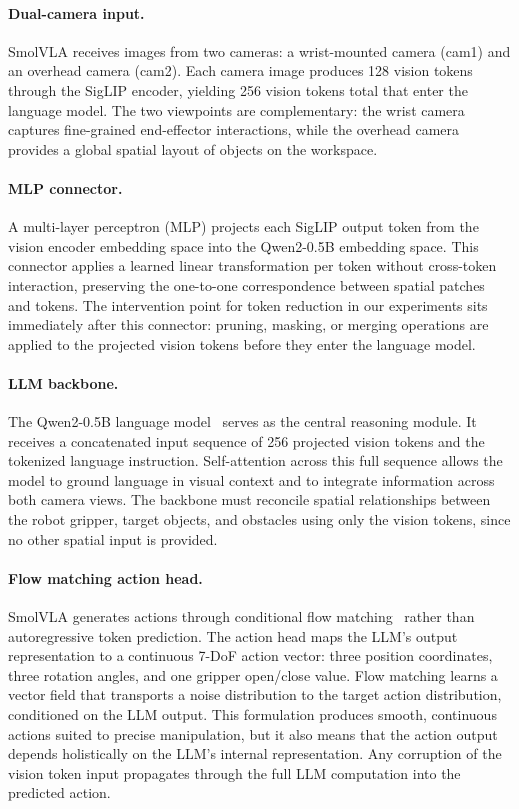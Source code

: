 \paragraph{Dual-camera input.}
SmolVLA receives images from two cameras: a wrist-mounted camera (cam1) and an overhead camera (cam2).
Each camera image produces 128 vision tokens through the SigLIP encoder, yielding 256 vision tokens total that enter the language model.
The two viewpoints are complementary: the wrist camera captures fine-grained end-effector interactions, while the overhead camera provides a global spatial layout of objects on the workspace.

\paragraph{MLP connector.}
A multi-layer perceptron (MLP) projects each SigLIP output token from the vision encoder embedding space into the Qwen2-0.5B embedding space.
This connector applies a learned linear transformation per token without cross-token interaction, preserving the one-to-one correspondence between spatial patches and tokens.
The intervention point for token reduction in our experiments sits immediately after this connector: pruning, masking, or merging operations are applied to the projected vision tokens before they enter the language model.

\paragraph{LLM backbone.}
The Qwen2-0.5B language model~\cite{yang2024qwen2} serves as the central reasoning module.
It receives a concatenated input sequence of 256 projected vision tokens and the tokenized language instruction.
Self-attention across this full sequence allows the model to ground language in visual context and to integrate information across both camera views.
The backbone must reconcile spatial relationships between the robot gripper, target objects, and obstacles using only the vision tokens, since no other spatial input is provided.

\paragraph{Flow matching action head.}
SmolVLA generates actions through conditional flow matching~\cite{lipman2023flow} rather than autoregressive token prediction.
The action head maps the LLM's output representation to a continuous 7-DoF action vector: three position coordinates, three rotation angles, and one gripper open/close value.
Flow matching learns a vector field that transports a noise distribution to the target action distribution, conditioned on the LLM output.
This formulation produces smooth, continuous actions suited to precise manipulation, but it also means that the action output depends holistically on the LLM's internal representation.
Any corruption of the vision token input propagates through the full LLM computation into the predicted action.

